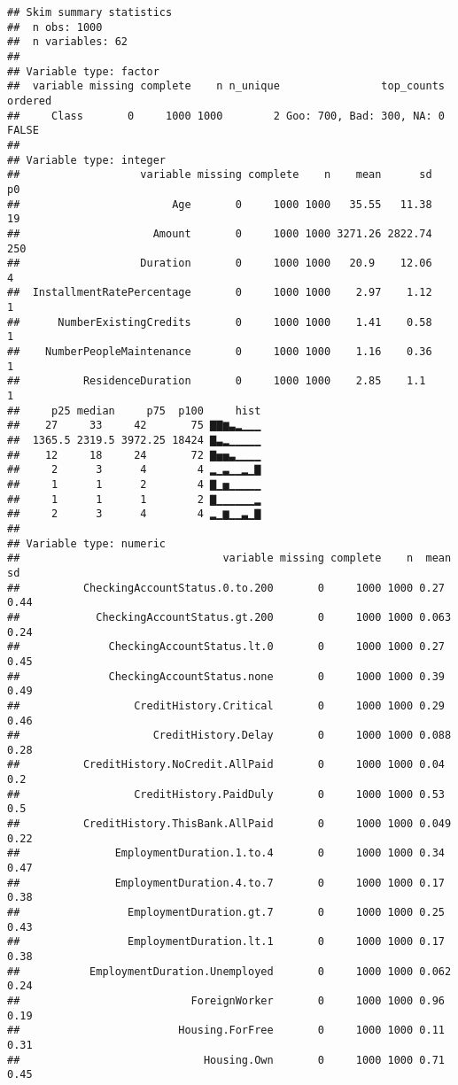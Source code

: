 \documentclass[]{article}
\begin{document}
\begin{verbatim}
## Skim summary statistics
##  n obs: 1000 
##  n variables: 62 
## 
## Variable type: factor 
##  variable missing complete    n n_unique                top_counts ordered
##     Class       0     1000 1000        2 Goo: 700, Bad: 300, NA: 0   FALSE
## 
## Variable type: integer 
##                   variable missing complete    n    mean      sd  p0
##                        Age       0     1000 1000   35.55   11.38  19
##                     Amount       0     1000 1000 3271.26 2822.74 250
##                   Duration       0     1000 1000   20.9    12.06   4
##  InstallmentRatePercentage       0     1000 1000    2.97    1.12   1
##      NumberExistingCredits       0     1000 1000    1.41    0.58   1
##    NumberPeopleMaintenance       0     1000 1000    1.16    0.36   1
##          ResidenceDuration       0     1000 1000    2.85    1.1    1
##     p25 median     p75  p100     hist
##    27     33     42       75 ▇▇▆▃▂▁▁▁
##  1365.5 2319.5 3972.25 18424 ▇▃▂▁▁▁▁▁
##    12     18     24       72 ▇▅▅▃▁▁▁▁
##     2      3      4        4 ▂▁▃▁▁▂▁▇
##     1      1      2        4 ▇▁▅▁▁▁▁▁
##     1      1      1        2 ▇▁▁▁▁▁▁▂
##     2      3      4        4 ▂▁▆▁▁▃▁▇
## 
## Variable type: numeric 
##                                variable missing complete    n  mean    sd
##          CheckingAccountStatus.0.to.200       0     1000 1000 0.27  0.44 
##            CheckingAccountStatus.gt.200       0     1000 1000 0.063 0.24 
##              CheckingAccountStatus.lt.0       0     1000 1000 0.27  0.45 
##              CheckingAccountStatus.none       0     1000 1000 0.39  0.49 
##                  CreditHistory.Critical       0     1000 1000 0.29  0.46 
##                     CreditHistory.Delay       0     1000 1000 0.088 0.28 
##          CreditHistory.NoCredit.AllPaid       0     1000 1000 0.04  0.2  
##                  CreditHistory.PaidDuly       0     1000 1000 0.53  0.5  
##          CreditHistory.ThisBank.AllPaid       0     1000 1000 0.049 0.22 
##               EmploymentDuration.1.to.4       0     1000 1000 0.34  0.47 
##               EmploymentDuration.4.to.7       0     1000 1000 0.17  0.38 
##                 EmploymentDuration.gt.7       0     1000 1000 0.25  0.43 
##                 EmploymentDuration.lt.1       0     1000 1000 0.17  0.38 
##           EmploymentDuration.Unemployed       0     1000 1000 0.062 0.24 
##                           ForeignWorker       0     1000 1000 0.96  0.19 
##                         Housing.ForFree       0     1000 1000 0.11  0.31 
##                             Housing.Own       0     1000 1000 0.71  0.45 

\end{verbatim}
\end{document}
